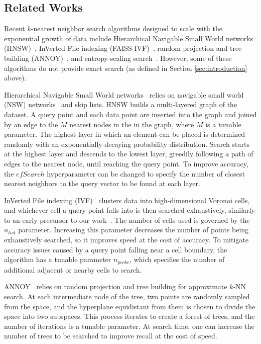 \subsection{Related Works}
\label{sec:intoduction:related-works}

Recent $k$-nearest neighbor search algorithms designed to scale with the exponential growth of data include Hierarchical Navigable Small World networks (HNSW)~\cite{malkov2016hnsw}, InVerted File indexing (FAISS-IVF)~\cite{faissivf}, random projection and tree building (ANNOY)~\cite{annoy}, and entropy-scaling search~\cite{yu2015entropy, ishaq2019clustered}. However, some of these algorithms do not provide exact search (as defined in Section \ref{sec:introduction} above).

Hierarchical Navigable Small World networks~\cite{malkov2016hnsw} relies on navigable small world (NSW) networks~\cite{kleinberg2000navigation, boguna2009navigability} and skip lists.
HNSW builds a multi-layered graph of the dataset.
A query point and each data point are inserted into the graph and joined by an edge to the $M$ nearest nodes in the in the graph, where $M$ is a tunable parameter.
The highest layer in which an element can be placed is determined randomly with an exponentially-decaying probability distribution.
Search starts at the highest layer and descends to the lowest layer, greedily following a path of edges to the nearest node, until reaching the query point.
To improve accuracy, the $efSearch$ hyperparameter can be changed to specify the number of closest nearest neighbors to the query vector to be found at each layer.

InVerted File indexing (IVF)~\cite{faissivf, sacks1987multikey, kent1990signature} clusters data into high-dimensional Voronoi cells, and whichever cell a query point falls into is then searched exhaustively, similarly to an early precursor to our work~\cite{yu2015entropy}.
The number of cells used is governed by the $n_{list}$ parameter.
Increasing this parameter decreases the number of points being exhaustively searched, so it improves speed at the cost of accuracy.
To mitigate accuracy issues caused by a query point falling near a cell boundary, the algorithm has a tunable parameter $n_{probe}$, which specifies the number of additional adjacent or nearby cells to search.

ANNOY~\cite{annoy} relies on random projection and tree building for approximate $k$-NN search.
At each intermediate node of the tree, two points are randomly sampled from the space, and the hyperplane equidistant from them is chosen to divide the space into two subspaces.
This process iterates to create a forest of trees, and the number of iterations is a tunable parameter.
At search time, one can increase the number of trees to be searched to improve recall at the cost of speed.


